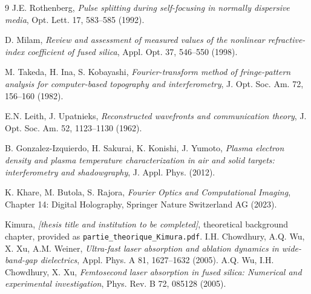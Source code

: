 \begin{thebibliography}{9}
J.E. Rothenberg,
\textit{Pulse splitting during self-focusing in normally dispersive media},
Opt. Lett. 17, 583--585 (1992).

D. Milam,
\textit{Review and assessment of measured values of the nonlinear refractive-index coefficient of fused silica},
Appl. Opt. 37, 546--550 (1998).

M. Takeda, H. Ina, S. Kobayashi,
\textit{Fourier-transform method of fringe-pattern analysis for computer-based topography and interferometry},
J. Opt. Soc. Am. 72, 156--160 (1982).

E.N. Leith, J. Upatnieks,
\textit{Reconstructed wavefronts and communication theory},
J. Opt. Soc. Am. 52, 1123--1130 (1962).

B. Gonzalez-Izquierdo, H. Sakurai, K. Konishi, J. Yumoto,
\textit{Plasma electron density and plasma temperature characterization in air and solid targets: interferometry and shadowgraphy},
J. Appl. Phys. (2012).

K. Khare, M. Butola, S. Rajora,
\textit{Fourier Optics and Computational Imaging}, Chapter 14: Digital Holography,
Springer Nature Switzerland AG (2023).

Kimura,
\textit{[thesis title and institution to be completed]},
theoretical background chapter, provided as \texttt{partie\_theorique\_Kimura.pdf}.
I.H. Chowdhury, A.Q. Wu, X. Xu, A.M. Weiner,
\textit{Ultra-fast laser absorption and ablation dynamics in wide-band-gap dielectrics},
Appl. Phys. A 81, 1627--1632 (2005).
A.Q. Wu, I.H. Chowdhury, X. Xu,
\textit{Femtosecond laser absorption in fused silica: Numerical and experimental investigation},
Phys. Rev. B 72, 085128 (2005).
\end{thebibliography}
